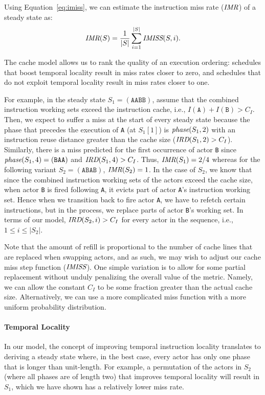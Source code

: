 \documentclass{sigplanconf}
\newcommand{\mt}[1]{\mbox{\it #1}}
\begin{document}
Using 
Equation~\ref{eq:imiss}, we can estimate the instruction miss
rate ($\mt{IMR}$) of a steady state as: 
\begin{equation}
\label{eq:imr}
  \mt{IMR}(S) = \frac{1}{|S|}\sum_{i=1}^{|S|} \mt{IMISS}(S,i).
\end{equation}

The cache model allows us to rank the quality of an
execution ordering: schedules that boost temporal locality
result in miss rates closer to zero, and schedules that do not
exploit temporal locality result in miss rates closer to one.

For example, in the steady 
state $S_1=(\texttt{AABB})$, assume that the combined instruction working
sets exceed the instruction cache, i.e., $I(\texttt{A}) + I(\texttt{B}) > C_I$.
Then, we expect to suffer a miss at the start of every
steady state because the phase that precedes the execution of
\texttt{A} (at $S_1[1]$) is $\mt{phase}(S_1,2)$ with 
an instruction reuse distance greater than the cache size 
($\mt{IRD}(S_1,2) > C_I$). Similarly, there is a 
miss predicted for the first occurrence of actor \texttt{B} since
$\mt{phase}(S_1,4)=(\texttt{BAA})$ and 
$\mt{IRD}(S_1, 4)>C_I$. Thus, $\mt{IMR}(S_1)=2/4$ whereas for the
following variant $S_2=(\texttt{ABAB})$, $\mt{IMR}(S_2)=1$.
In the case of $S_2$, we know that since the combined
instruction working sets of the actors exceed the cache size, when
actor \texttt{B} is fired following \texttt{A}, it evicts part of
actor \texttt{A}'s instruction working set. Hence when we transition
back to fire actor \texttt{A}, we have to refetch certain
instructions, but in the process, we replace parts of actor
\texttt{B}'s working set. In terms of our model, $\mt{IRD}(S_2,i)>C_I$
for every actor in the sequence, i.e., $1\le i\le|S_2|$.

Note that the
amount of refill is proportional to the number of cache lines that are
replaced when swapping actors, and as such, we may wish to adjust
our cache miss step function ($\mt{IMISS}$). One simple variation is to allow for
some partial replacement without unduly penalizing the overall value
of the metric. Namely, we can allow the constant $C_I$ to be some
fraction greater than the actual cache size. Alternatively, we can use
a more complicated miss function with a more uniform probability
distribution.

\paragraph*{Temporal Locality} In our model, the concept of improving
temporal instruction locality translates to deriving a steady state where, in the
best case, every actor has only one phase that is longer than unit-length.
For example, a permutation of the actors in $S_2$ (where all
phases are of length two) that improves temporal locality
will result in $S_1$, which we have shown has a relatively lower miss rate.
\end{document}
